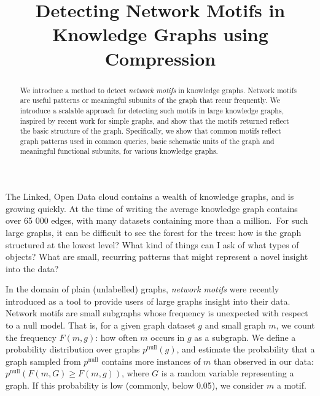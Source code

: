 \documentclass[11pt]{article}
\title{Detecting Network Motifs in Knowledge Graphs using Compression}
\begin{document}
\maketitle

\begin{abstract}
We introduce a method to detect \emph{network motifs} in knowledge graphs. Network motifs are useful patterns or meaningful subunits of the graph that recur frequently. We introduce a scalable approach for detecting such motifs in large knowledge graphs, inspired by recent work for simple graphs, and show that the motifs returned reflect the basic structure of the graph. Specifically, we show that common motifs reflect graph patterns used in common queries, basic schematic units of the graph and meaningful functional subunits, for various knowledge graphs.
\end{abstract}

\noindent The Linked, Open Data cloud contains a wealth of knowledge graphs, and is growing quickly. At the time of writing the average knowledge graph contains over 65 000 edges, with many datasets containing more than a million.\footnotemark~For such large graphs, it can be difficult to see the forest for the trees: how is the graph structured at the lowest level? What kind of things can I ask of what types of objects? What are small, recurring patterns that might represent a novel insight into the data?


In the domain of plain (unlabelled) graphs, \emph{network motifs} \cite{milo2002network} were recently introduced as a tool to provide users of large graphs insight into their data. Network motifs are small subgraphs whose frequency is unexpected with respect to a null model. That is, for a given graph dataset $g$ and small graph $m$, we count the frequency $F(m, g)$: how often $m$ occurs in $g$ as a subgraph. We define a probability distribution over graphs $p^\text{null}(g)$, and estimate the probability that a graph sampled from $p^\text{null}$ contains more instances of $m$ than observed in our data: $p^\text{null}(F(m, G) \geq F(m, g))$, where $G$ is a random variable representing a graph. If this probability is low (commonly, below 0.05), we consider $m$ a motif. \footnotemark

\end{document}
